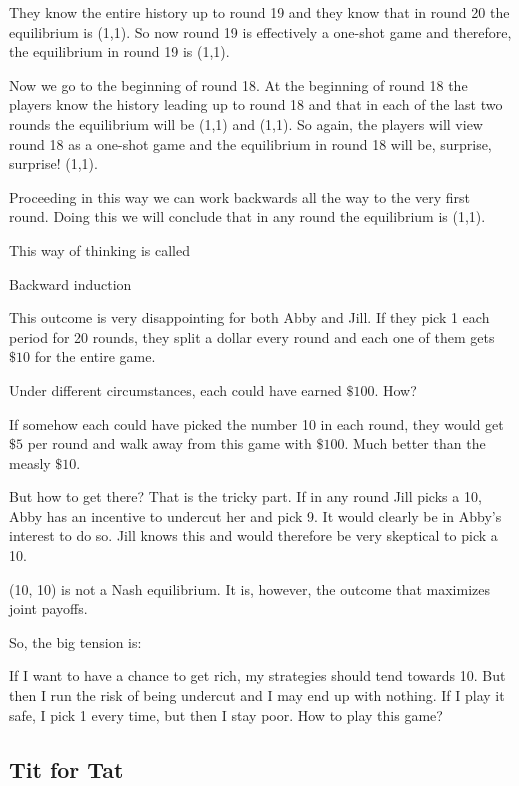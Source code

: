 \documentclass[
]{book}
\begin{document}
They know the entire history up to round 19 and they know that in round 20 the equilibrium is (1,1). So now round 19 is effectively a one-shot game and therefore, the equilibrium in round 19 is (1,1).

Now we go to the beginning of round 18. At the beginning of round 18 the players know the history leading up to round 18 and that in each of the last two rounds the equilibrium will be (1,1) and (1,1). So again, the players will view round 18 as a one-shot game and the equilibrium in round 18 will be, surprise, surprise! (1,1).

Proceeding in this way we can work backwards all the way to the very first round. Doing this we will conclude that in any round the equilibrium is (1,1).

This way of thinking is called

\begin{center}
Backward induction

\end{center}

This outcome is very disappointing for both Abby and Jill. If they pick 1 each period for 20 rounds, they split a dollar every round and each one of them gets \(\$10\) for the entire game.

Under different circumstances, each could have earned \(\$100\). How?

If somehow each could have picked the number 10 in each round, they would get \(\$5\) per round and walk away from this game with \(\$100\). Much better than the measly \(\$10\).

But how to get there? That is the tricky part. If in any round Jill picks a 10, Abby has an incentive to undercut her and pick 9. It would clearly be in Abby's interest to do so. Jill knows this and would therefore be very skeptical to pick a 10.

(10, 10) is not a Nash equilibrium. It is, however, the outcome that maximizes joint payoffs.

So, the big tension is:

If I want to have a chance to get rich, my strategies should tend towards 10. But then I run the risk of being undercut and I may end up with nothing. If I play it safe, I pick 1 every time, but then I stay poor.
How to play this game?

\hypertarget{tit-for-tat}{%
\subsection{Tit for Tat}\label{tit-for-tat}}
\end{document}
